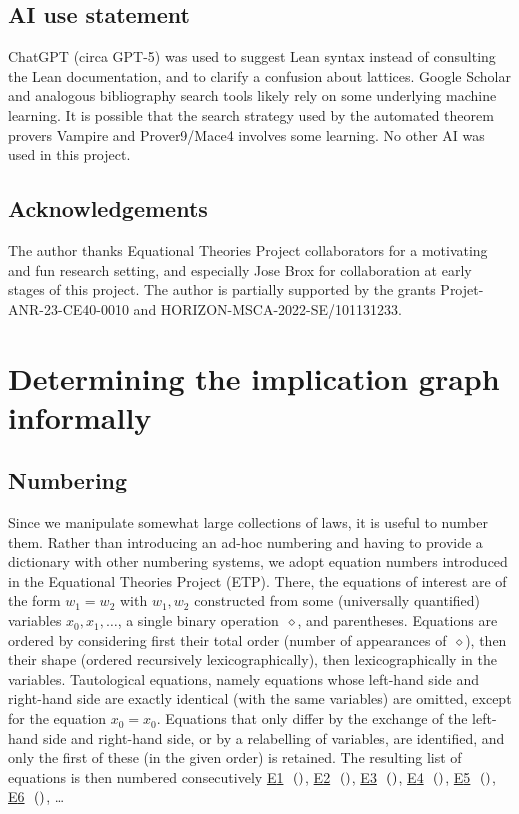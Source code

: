 \documentclass[12pt]{amsart}
\theoremstyle{plain}
\theoremstyle{definition}
\newcommand{\op}{\diamond}
\newcommand{\implicitop}{}
\newcommand{\Equaref}[1]{\href{https://teorth.github.io/equational_theories/implications/?#1}{\textrm{\textup{E}}#1}}
\newcommand{\Equareffull}[1]{\Equaref{#1}\ifmmode\,\else\ \fi\ensuremath{(\csname Equa#1\endcsname)}}
\begin{document}
\subsection*{AI use statement}

ChatGPT (circa GPT-5) was used to suggest Lean syntax instead of consulting the Lean documentation, and to clarify a confusion about lattices.
Google Scholar and analogous bibliography search tools likely rely on some underlying machine learning.
It is possible that the search strategy used by the automated theorem provers Vampire and Prover9/Mace4 involves some learning.
No other AI was used in this project.

\subsection*{Acknowledgements}

The author thanks Equational Theories Project collaborators for a motivating and fun research setting, and especially Jose Brox for collaboration at early stages of this project.
The author is partially supported by the grants Projet-ANR-23-CE40-0010 and HORIZON-MSCA-2022-SE/101131233.

\section{Determining the implication graph informally}
\label{sec:informal}

\subsection{Numbering}
\label{subsec:numbering}

Since we manipulate somewhat large collections of laws, it is useful to number them.  Rather than introducing an ad-hoc numbering and having to provide a dictionary with other numbering systems, we adopt equation numbers introduced in the Equational Theories Project (ETP\@).  There, the equations of interest are of the form $w_1=w_2$ with $w_1,w_2$ constructed from some (universally quantified) variables $x_0,x_1,\dots$, a single binary operation~$\op$, and parentheses.  Equations are ordered by considering first their total order (number of appearances of~$\op$), then their shape (ordered recursively lexicographically), then lexicographically in the variables.
Tautological equations, namely equations whose left-hand side and right-hand side are exactly identical (with the same variables) are omitted, except for the equation $x_0=x_0$.
Equations that only differ by the exchange of the left-hand side and right-hand side, or by a relabelling of variables, are identified, and only the first of these (in the given order) is retained.
The resulting list of equations is then numbered consecutively
{\renewcommand{\implicitop}{\op}%
\Equareffull{1}, \Equareffull{2}, \Equareffull{3}, \Equareffull{4}, \Equareffull{5}, \Equareffull{6}, \dots}
\end{document}
